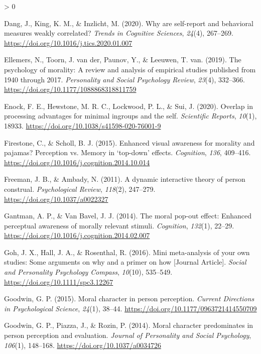 \documentclass[
  english,
  man]{apa6}
\newlength{\cslhangindent}
\newenvironment{CSLReferences}[2] %
 {%
  \setlength{\parindent}{0pt}
  \ifodd #1 \everypar{\setlength{\hangindent}{\cslhangindent}}\ignorespaces\fi
  \ifnum #2 > 0
  \setlength{\parskip}{#2\baselineskip}
  \fi
 }%
 {}
\begin{document}
\begin{CSLReferences}{1}{0}
\leavevmode\hypertarget{ref-dang_why_2020}{}%
Dang, J., King, K. M., \& Inzlicht, M. (2020). Why are self-report and behavioral measures weakly correlated? \emph{Trends in Cognitive Sciences}, \emph{24}(4), 267--269. \url{https://doi.org/10.1016/j.tics.2020.01.007}

\leavevmode\hypertarget{ref-ellemers_psychology_2019}{}%
Ellemers, N., Toorn, J. van der, Paunov, Y., \& Leeuwen, T. van. (2019). The psychology of morality: A review and analysis of empirical studies published from 1940 through 2017. \emph{Personality and Social Psychology Review}, \emph{23}(4), 332--366. \url{https://doi.org/10.1177/1088868318811759}

\leavevmode\hypertarget{ref-enock_overlap_2020}{}%
Enock, F. E., Hewstone, M. R. C., Lockwood, P. L., \& Sui, J. (2020). Overlap in processing advantages for minimal ingroups and the self. \emph{Scientific Reports}, \emph{10}(1), 18933. \url{https://doi.org/10.1038/s41598-020-76001-9}

\leavevmode\hypertarget{ref-firestone_enhanced_2015}{}%
Firestone, C., \& Scholl, B. J. (2015). Enhanced visual awareness for morality and pajamas? Perception vs. Memory in {`top-down'} effects. \emph{Cognition}, \emph{136}, 409--416. \url{https://doi.org/10.1016/j.cognition.2014.10.014}

\leavevmode\hypertarget{ref-freeman_dynamic_2011}{}%
Freeman, J. B., \& Ambady, N. (2011). A dynamic interactive theory of person construal. \emph{Psychological Review}, \emph{118}(2), 247--279. \url{https://doi.org/10.1037/a0022327}

\leavevmode\hypertarget{ref-gantman_moral_2014}{}%
Gantman, A. P., \& Van Bavel, J. J. (2014). The moral pop-out effect: Enhanced perceptual awareness of morally relevant stimuli. \emph{Cognition}, \emph{132}(1), 22--29. \url{https://doi.org/10.1016/j.cognition.2014.02.007}

\leavevmode\hypertarget{ref-Goh_2016_mini}{}%
Goh, J. X., Hall, J. A., \& Rosenthal, R. (2016). Mini meta-analysis of your own studies: Some arguments on why and a primer on how {[}Journal Article{]}. \emph{Social and Personality Psychology Compass}, \emph{10}(10), 535--549. \url{https://doi.org/10.1111/spc3.12267}

\leavevmode\hypertarget{ref-goodwin_moral_2015}{}%
Goodwin, G. P. (2015). Moral character in person perception. \emph{Current Directions in Psychological Science}, \emph{24}(1), 38--44. \url{https://doi.org/10.1177/0963721414550709}

\leavevmode\hypertarget{ref-goodwin_moral_2014}{}%
Goodwin, G. P., Piazza, J., \& Rozin, P. (2014). Moral character predominates in person perception and evaluation. \emph{Journal of Personality and Social Psychology}, \emph{106}(1), 148--168. \url{https://doi.org/10.1037/a0034726}


\end{CSLReferences}
\end{document}
